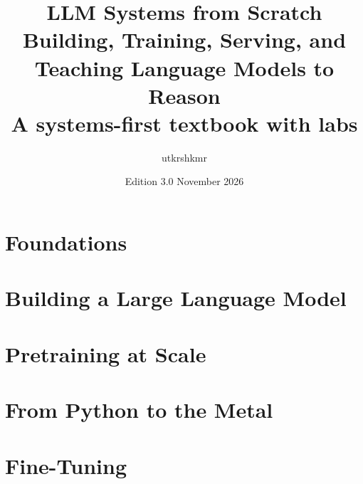 \documentclass[11pt,twoside,openany]{book}
\title{\Huge\bfseries LLM Systems from Scratch\\[0.6em]
  \Large Building, Training, Serving, and Teaching Language Models to Reason\\[0.3em]
  \large A systems-first textbook with labs}
\author{utkrshkmr}
\date{Edition 3.0 \quad November 2026}
\begin{document}
\frontmatter
\maketitle

\setcounter{tocdepth}{1}
\tableofcontents


\mainmatter
\part{Foundations}


\part{Building a Large Language Model}









\part{Pretraining at Scale}








\part{From Python to the Metal}




\part{Fine-Tuning}


\end{document}
